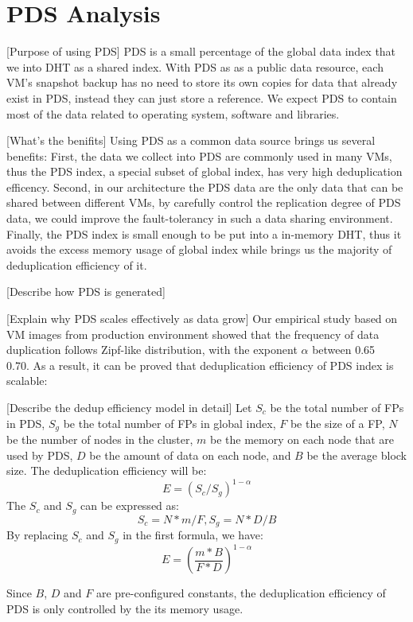 \section{PDS Analysis}
[Purpose of using PDS]
PDS is a small percentage of the global data index that we into DHT as a shared index. 
With PDS as as a public data resource, each VM's snapshot backup has no need to 
store its own copies for data that already exist in PDS, instead they can just
store a reference. 
We expect PDS to contain most of the data related to operating system, software and libraries.

[What's the benifits]
Using PDS as a common data source brings us several benefits: 
First, the data we collect into PDS are commonly used in many VMs, 
thus the PDS index, a special subset of global index, has very high deduplication efficency.
Second, in our architecture the PDS data are the only data that can be shared between different VMs,
by carefully control the replication degree of PDS data, we could improve the fault-tolerancy
in such a data sharing environment. Finally, the PDS index is small enough to be put into a 
in-memory DHT, thus it avoids the excess memory usage of global index 
while brings us the majority of deduplication efficiency of it.

[Describe how PDS is generated]

[Explain why PDS scales effectively as data grow]
Our empirical study based on VM images from production environment\cite{ieeecloud} showed that the 
frequency of data duplication follows Zipf-like distribution\cite{zipf}, 
with the exponent $\alpha$ between 0.65 ~ 0.70. 
As a result, it can be proved that deduplication efficiency of PDS index is scalable:

[Describe the dedup efficiency model in detail]
Let $S_c$ be the total number of FPs in PDS, $S_g$ be the total number of FPs in global index, $F$ be the size of a FP, $N$ be the number of nodes in the cluster, $m$ be the memory on each node that are used by PDS, $D$ be the amount of data on each node, and $B$ be the average block size. The deduplication efficiency will be:
\begin{equation}
  E = (S_c / S_g)^{1-\alpha}
\end{equation}
The $S_c$ and $S_g$ can be expressed as:
\begin{equation}
S_c = N*m/F, S_g = N*D/B
\end{equation}
By replacing $S_c$ and $S_g$ in the first formula, we have:
\begin{equation}
  E = (\frac{m*B}{F*D})^{1-\alpha}
\end{equation}

Since $B$, $D$ and $F$ are pre-configured constants, the deduplication efficiency of PDS is only controlled by the its memory usage.